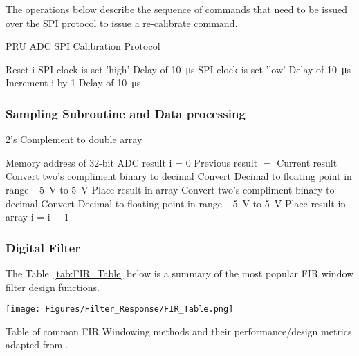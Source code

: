 The operations below describe the sequence of commands that need to be issued over the SPI protocol to issue a re-calibrate command. 
\begin{algorithm}[H]
\caption{PRU ADC SPI Calibration Protocol}
\label{alg:Pru_Cal}
\begin{algorithmic}
\State  Reset i
\State SPI clock is set 'high'
\State Delay of \qty{10}{\us}
\State SPI clock is set 'low'
\State Delay of \qty{10}{\us}
\State  Increment i by 1 
\EndFor
\State Delay of \qty{10}{\us}
\end{algorithmic}
\end{algorithm}






\subsubsection{Sampling Subroutine and Data processing}
\label{sec:Sample}


\begin{algorithm}[H]
\caption{2's Complement to double array}
\label{alg:Sample}
\begin{algorithmic}
\Require Memory address of 32-bit ADC result
\State i = 0
        \State Previous result $=$ Current result
            \State Convert two's compliment binary to decimal 
            \State Convert Decimal to floating point in range \qty{-5}{\volt} to \qty{5}{\volt} 
            \State Place result in array
        \EndFor
            \State Convert two's compliment binary to decimal 
            \State Convert Decimal to floating point in range \qty{-5}{\volt} to \qty{5}{\volt} 
            \State Place result in array
        \EndFor
        \State i = i + 1
    \EndIf
\EndWhile
\EndFunction

\end{algorithmic}
\end{algorithm}

\subsubsection{Digital Filter}
\label{sec:Filter}
The Table~\ref{tab:FIR_Table} below is a summary of the most popular FIR window filter design functions.
\begin{table}[H]
    \centering
    \texttt{[image: Figures/Filter\_Response/FIR\_Table.png]}
    \caption{Table of common FIR Windowing methods and their performance/design metrics adapted from \cite{arar_2016}.}
    \label{tab:FIR_Table}
\end{table}

